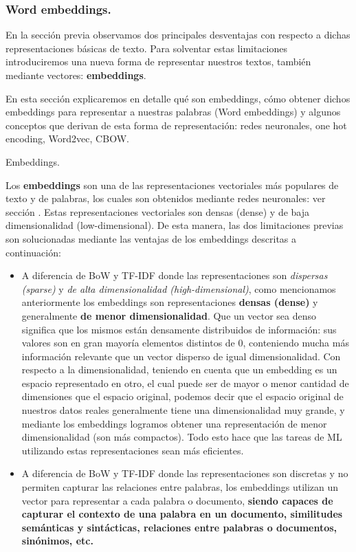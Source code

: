\documentclass[12pt,a4paper]{article}
\makeatletter
\renewcommand\paragraph{\@startsection{paragraph}{4}{\z@}
            {-2.5ex\@plus -1ex \@minus -.25ex}
            {1.25ex \@plus .25ex}
            {\normalfont\normalsize\bfseries}}
\makeatother
\begin{document}
\begin{sloppypar}
\cleardoublepage

\subsubsection{Word embeddings.}\label{word_emb}
En la sección previa observamos dos principales desventajas con respecto a dichas representaciones básicas de texto. Para solventar estas limitaciones introduciremos una nueva forma de representar nuestros textos, también mediante vectores: \textbf{embeddings}. 

En esta sección explicaremos en detalle qué son embeddings, cómo obtener dichos embeddings para representar a nuestras palabras (Word embeddings) y algunos conceptos que derivan de esta forma de representación: redes neuronales, one hot encoding, Word2vec, CBOW.

\paragraph{Embeddings.}\label{embedd}

Los \textbf{embeddings} son una de las representaciones vectoriales más populares de texto y de palabras, los cuales son obtenidos mediante redes neuronales: ver sección \textit{}. Estas representaciones vectoriales son densas (dense) y de baja dimensionalidad (low-dimensional)\cite{NLP_26}. De esta manera, las dos limitaciones previas son solucionadas mediante las ventajas de los embeddings descritas a continuación:
\begin{itemize}
\item A diferencia de BoW y TF-IDF donde las representaciones son \textit{dispersas (sparse)} y \textit{de alta dimensionalidad (high-dimensional)}, como mencionamos anteriormente los embeddings son representaciones \textbf{densas (dense)} y generalmente \textbf{de menor dimensionalidad}. Que un vector sea denso significa que los mismos están densamente distribuidos de información: sus valores son en gran mayoría elementos distintos de 0, conteniendo mucha más información relevante que un vector disperso de igual dimensionalidad\cite{NLP_9}. Con respecto a la dimensionalidad, teniendo en cuenta que un embedding es un espacio representado en otro, el cual puede ser de mayor o menor cantidad de dimensiones que el espacio original, podemos decir que el espacio original de nuestros datos reales generalmente tiene una dimensionalidad muy grande, y mediante los embeddings  logramos obtener una representación de menor dimensionalidad (son más compactos)\cite{apunte_uba}. Todo esto hace que las tareas de ML utilizando estas representaciones sean más eficientes. 
\item A diferencia de BoW y TF-IDF donde las representaciones son discretas y no permiten capturar las relaciones entre palabras, los embeddings utilizan un vector para representar a cada palabra o documento, \textbf{siendo capaces de capturar el contexto de una palabra en un documento, similitudes semánticas y sintácticas, relaciones entre palabras o documentos, sinónimos, etc.} 
\end{itemize}


\end{sloppypar}
\end{document}

